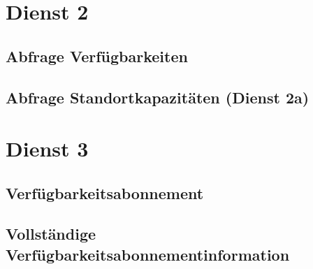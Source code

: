 \section{Dienst 2}
\label{subsec:Nachrichten:Dienst2}

\subsection*{Abfrage Verfügbarkeiten}
\label{subsec:Nachrichten:Dienst2:Availability}





\subsection*{Abfrage Standortkapazitäten (Dienst 2a)}
\label{subsec:Nachrichten:Dienst2:PlaceAvailability}





\section{Dienst 3}
\label{subsec:Nachrichten:Dienst3}

\subsection*{Verfügbarkeitsabonnement}
\label{subsec:Nachrichten:Dienst3:AvailabilitySubscription}







\subsection*{Vollständige Verfügbarkeitsabonnementinformation}
\label{subsec:Nachrichten:Dienst3:CompleteAvailability}





